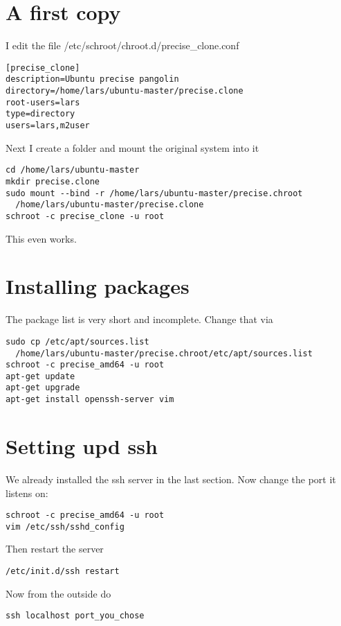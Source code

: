 \documentclass[a4paper]{article}
\begin{document}
\section{A first copy}
I edit the file /etc/schroot/chroot.d/precise\_clone.conf

\begin{verbatim}
[precise_clone]
description=Ubuntu precise pangolin
directory=/home/lars/ubuntu-master/precise.clone
root-users=lars
type=directory
users=lars,m2user
\end{verbatim}

Next I create a folder and mount the original system into it

\begin{verbatim}
cd /home/lars/ubuntu-master
mkdir precise.clone
sudo mount --bind -r /home/lars/ubuntu-master/precise.chroot 
  /home/lars/ubuntu-master/precise.clone
schroot -c precise_clone -u root
\end{verbatim}

This even works.

\section{Installing packages}
The package list is very short and incomplete. Change that via

\begin{verbatim}
sudo cp /etc/apt/sources.list 
  /home/lars/ubuntu-master/precise.chroot/etc/apt/sources.list
schroot -c precise_amd64 -u root
apt-get update
apt-get upgrade
apt-get install openssh-server vim
\end{verbatim}

\section{Setting upd ssh}

We already installed the ssh server in the last section. Now change the port it listens on:

\begin{verbatim}
schroot -c precise_amd64 -u root
vim /etc/ssh/sshd_config
\end{verbatim}

Then restart the server

\begin{verbatim}
/etc/init.d/ssh restart
\end{verbatim}

Now from the outside do

\begin{verbatim}
ssh localhost port_you_chose
\end{verbatim}
\end{document}
